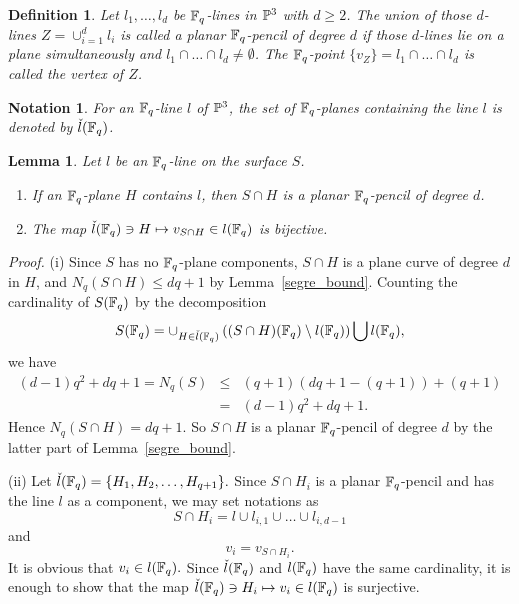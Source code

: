 \documentclass[a4paper,11pt]{article}
\newtheorem{lemma}[theorem]{Lemma}
\newtheorem{definition}[theorem]{Definition}
\newtheorem{notation}[theorem]{Notation}
\newcommand{\proof}{\noindent \mbox{\em Proof.\hspace*{2mm}}}
\begin{document}
\begin{definition}
Let $l_1, \dots , l_d$ be ${\Bbb F}_q$-lines in ${\Bbb P}^3$
with $d \geq 2$.
The union of those $d$-lines $Z = \cup_{i=1}^d l_i$
is called a planar ${\Bbb F}_q$-pencil of degree $d$
if those $d$-lines lie on a plane simultaneously
and $l_1 \cap \dots \cap l_d \neq \emptyset$.
The ${\Bbb F}_q$-point $\{v_Z\} = l_1 \cap \dots \cap l_d$
is called the vertex of $Z$.
\end{definition}
%
\begin{notation}
For an ${\Bbb F}_q$-line $l$ of ${\Bbb P}^3$,
the set of ${\Bbb F}_q$-planes containing the line $l$
is denoted by $\check{l}({\Bbb F}_q)$.
\end{notation}
%
\begin{lemma}\label{planar_pencil}
Let $l$ be an ${\Bbb F}_q$-line on the surface $S$.
\begin{enumerate}[{\rm (i)}]
\item If an ${\Bbb F}_q$-plane $H$ contains $l$,
then $S\cap H$ is a planar ${\Bbb F}_q$-pencil of degree $d$.
\item The map
$\check{l}({\Bbb F}_q) \ni H \mapsto v_{S\cap H} \in l({\Bbb F}_q)$
is bijective.
\end{enumerate}
\end{lemma}
\proof
(i) Since $S$ has no ${\Bbb F}_q$-plane components,
$S\cap H$ is a plane curve of degree $d$ in $H$,
and $N_q(S \cap H) \leq dq+1$
by Lemma~\ref{segre_bound}.
Counting the cardinality of $S({\Bbb F}_q)$ by the decomposition
\[
S({\Bbb F}_q) = \cup_{H \in \check{l}({\Bbb F}_q)}
   \left(
     (S\cap H)({\Bbb F}_q) \setminus l({\Bbb F}_q)
   \right)
   \bigcup l({\Bbb F}_q),
\]
we have
\begin{eqnarray*}
(d-1)q^2 + dq +1=N_q(S) &\leq& (q+1)(dq+1-(q+1))+(q+1)\\
                        &=& (d-1)q^2 + dq +1.
\end{eqnarray*}
Hence $N_q(S\cap H) =dq +1$.
So $S \cap H$ is a planar ${\Bbb F}_q$-pencil of degree $d$
by the latter part of Lemma~\ref{segre_bound}.

(ii) Let
$\check{l}({\Bbb F}_q)
=\{ H_1, H_2, \dots , H_{q+1} \}.$
Since $S\cap H_i$ is a planar  ${\Bbb F}_q$-pencil and
has the line $l$ as a component,
we may set notations as
\[
S \cap H_i = l \cup l_{i,1} \cup \dots \cup l_{i, d-1}
\]
and
\[ v_i = v_{S \cap H_i} .\]
It is obvious that $v_i \in l({\Bbb F}_q).$
Since $ \check{l}({\Bbb F}_q) $ and $l({\Bbb F}_q)$
have the same cardinality,
it is enough to show that the map
$\check{l}({\Bbb F}_q) \ni H_i \mapsto v_i \in l({\Bbb F}_q)$
is surjective.
\end{document}
